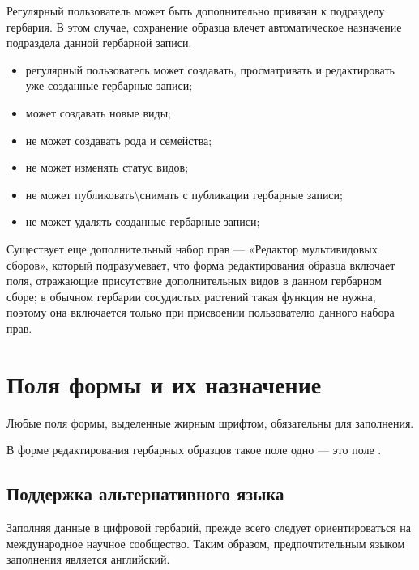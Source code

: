\documentclass[letterpaper,10pt,russian]{sphinxmanual}
\begin{document}
Регулярный пользователь может быть дополнительно привязан к подразделу гербария.
В этом случае, сохранение образца влечет автоматическое назначение подраздела данной гербарной записи.
\begin{itemize}
\item {} 
регулярный пользователь может создавать,  просматривать и редактировать уже созданные гербарные записи;

\item {} 
может создавать новые виды;

\item {} 
не может создавать рода и семейства;

\item {} 
не может изменять статус видов;

\item {} 
не может публиковать\textbackslash{}снимать с публикации гербарные записи;

\item {} 
не может удалять созданные гербарные записи;

\end{itemize}

Существует еще дополнительный набор прав — «Редактор мультивидовых сборов»,
который подразумевает, что форма редактирования образца включает поля,
отражающие присутствие дополнительных видов в данном гербарном сборе; в обычном
гербарии сосудистых растений такая функция не нужна,
поэтому она включается только при присвоении пользователю данного набора прав.

\ignorespaces 

\section{Поля формы и их назначение}
\label{\detokenize{main:index-8}}\label{\detokenize{main:id13}}
Любые поля формы, выделенные жирным шрифтом, обязательны для заполнения.

В форме редактирования гербарных образцов такое поле одно — это поле .

\ignorespaces 

\subsection{Поддержка альтернативного языка}
\label{\detokenize{main:index-9}}\label{\detokenize{main:id14}}
Заполняя данные в цифровой гербарий, прежде всего следует ориентироваться на международное научное сообщество.
Таким образом, предпочтительным языком заполнения является английский.
\end{document}
